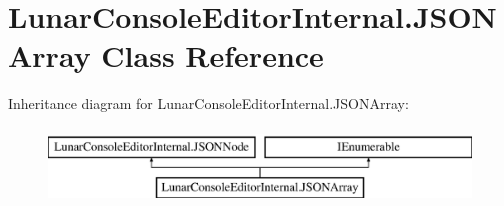 \hypertarget{class_lunar_console_editor_internal_1_1_j_s_o_n_array}{}\section{Lunar\+Console\+Editor\+Internal.\+J\+S\+O\+N\+Array Class Reference}
\label{class_lunar_console_editor_internal_1_1_j_s_o_n_array}
Inheritance diagram for Lunar\+Console\+Editor\+Internal.\+J\+S\+O\+N\+Array\+:\begin{figure}[H]
\begin{center}
\leavevmode
\includegraphics[height=2.000000cm]{class_lunar_console_editor_internal_1_1_j_s_o_n_array}
\end{center}
\end{figure}
